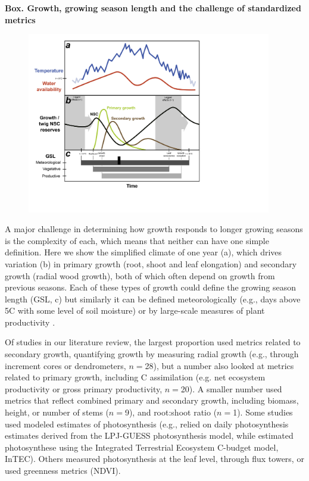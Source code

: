 \documentclass[11pt]{article}
\begin{document}
\renewcommand{\refname}{\CHead{}}




\newpage
{\bf Box. Growth, growing season length and the challenge of standardized metrics}
\begin{figure}[h!]
\includegraphics[width=0.95\textwidth]{..//figures/gslconcept/NEW_FI~1_ac_ver2.png}
\label{fig:defineGSLgrowth}
\end{figure}

A major challenge in determining how growth responds to longer growing seasons is the complexity of each, which means that neither can have one simple definition. Here we show the simplified climate of one year (a), which drives variation (b) in primary growth (root, shoot and leaf elongation) and secondary growth (radial wood growth), both of which often depend on growth from previous seasons. Each of these types of growth could define the growing season length (GSL, c) but similarly it can be defined meteorologically (e.g., days above 5\degree C with some level of soil moisture) or by large-scale measures of plant productivity \citep{korner2023four}. 

Of studies in our literature review, the largest proportion used metrics related to secondary growth, quantifying growth by measuring radial growth (e.g., through increment cores or dendrometers, $n=$28), but a number also looked at metrics related to primary growth, including C assimilation (e.g. net ecosystem productivity or gross primary productivity, $n=$20). A smaller number used metrics that reflect combined primary and secondary growth, including biomass, height, or number of stems ($n=$9), and root:shoot ratio ($n =$1). Some studies used modeled estimates of photosynthesis (e.g., \citet{smith2014implications} relied on daily photosynthesis estimates derived from the LPJ-GUESS photosynthesis model, while \citet{chen2000approaches} estimated photosynthese using the Integrated Terrestrial Ecosystem C-budget model, InTEC). 
Others measured photosynthesis at the leaf level, through flux towers, or used greenness metrics (NDVI). 
\end{document}
